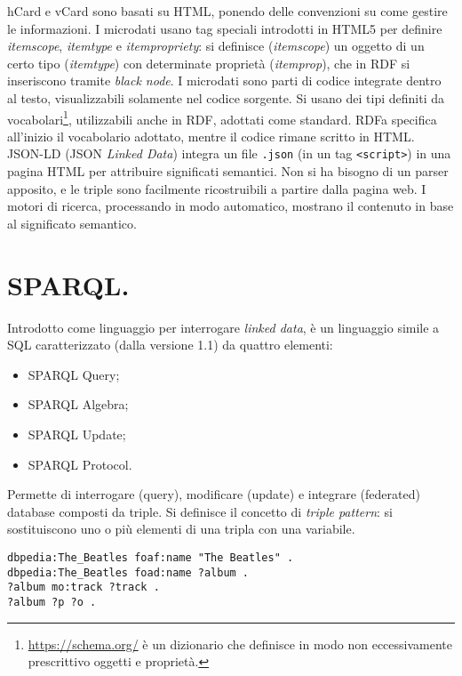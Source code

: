 \documentclass[11pt]{article}
\begin{document}
\begin{multicols}{2}
hCard e vCard sono basati su HTML, ponendo delle convenzioni su come gestire le informazioni. \newline
I microdati usano tag speciali introdotti in HTML5 per definire \textit{itemscope}, \textit{itemtype} e \textit{itempropriety}: si definisce (\textit{itemscope}) un oggetto di un certo tipo (\textit{itemtype}) con determinate proprietà (\textit{itemprop}), che in RDF si inseriscono tramite \textit{black node}.
I microdati sono parti di codice integrate dentro al testo, visualizzabili solamente nel codice sorgente.
Si usano dei tipi definiti da vocabolari\footnote{\url{https://schema.org/} è un dizionario che definisce in modo non eccessivamente prescrittivo oggetti e proprietà.}, utilizzabili anche in RDF, adottati come standard. \newline
RDFa specifica all'inizio il vocabolario adottato, mentre il codice rimane scritto in HTML. \newline
JSON-LD (JSON \textit{Linked Data}) integra un file \verb|.json| (in un tag \verb|<script>|) in una pagina HTML per attribuire significati semantici.
Non si ha bisogno di un parser apposito, e le triple sono facilmente ricostruibili a partire dalla pagina web.
I motori di ricerca, processando in modo automatico, mostrano il contenuto in base al significato semantico.

\section{SPARQL.}
Introdotto come linguaggio per interrogare \textit{linked data}, è un linguaggio simile a SQL caratterizzato (dalla versione 1.1) da quattro elementi:
\begin{itemize}
  \item SPARQL Query;
  \item SPARQL Algebra;
  \item SPARQL Update;
  \item SPARQL Protocol.
\end{itemize}
Permette di interrogare (query), modificare (update) e integrare (federated) database composti da triple.
Si definisce il concetto di \textit{triple pattern}: si sostituiscono uno o più elementi di una tripla con una variabile.
\end{multicols}
\begin{verbatim}
dbpedia:The_Beatles foaf:name "The Beatles" .
dbpedia:The_Beatles foad:name ?album .
?album mo:track ?track .
?album ?p ?o .
\end{verbatim}
\end{document}
